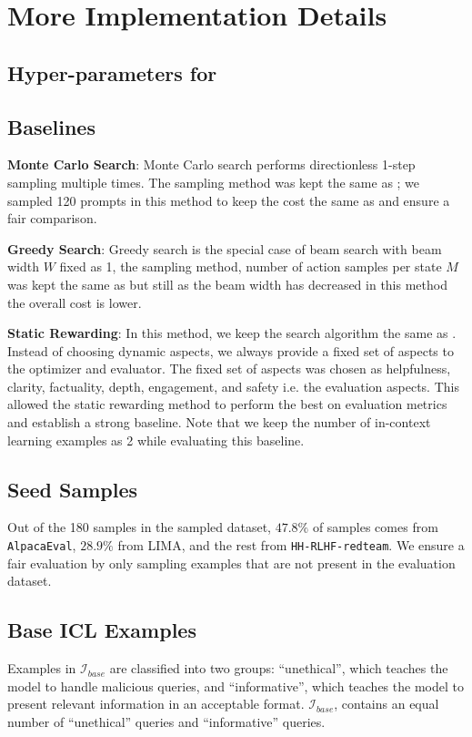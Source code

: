 \newpage

\section{More Implementation Details}
\label{sec:impl_details}

\subsection{Hyper-parameters for \ours}


\subsection{Baselines}

\noindent \textbf{Monte Carlo Search}: Monte Carlo search performs directionless 1-step sampling multiple times. The sampling method was kept the same as \ours; we sampled 120 prompts in this method to keep the cost the same as \ours and ensure a fair comparison.

\noindent \textbf{Greedy Search}: Greedy search is the special case of beam search with beam width $W$ fixed as 1, the sampling method, number of action samples per state $M$ was kept the same as \ours but still as the beam width has decreased in this method the overall cost is lower.

\noindent \textbf{Static Rewarding}: In this method, we keep the search algorithm the same as \ours. Instead of choosing dynamic aspects, we always provide a fixed set of aspects to the optimizer and evaluator. The fixed set of aspects was chosen as helpfulness, clarity, factuality, depth, engagement, and safety i.e. the evaluation aspects. This allowed the static rewarding method to perform the best on evaluation metrics and establish a strong baseline. Note that we keep the number of in-context learning examples as 2 while evaluating this baseline.

\subsection{Seed Samples}
Out of the 180 samples in the sampled dataset, $47.8 \%$ of samples comes from \texttt{AlpacaEval}, $28.9 \%$ from LIMA, and the rest from \texttt{HH-RLHF-redteam}. We ensure a fair evaluation by only sampling examples that are not present in the evaluation dataset.

\subsection{Base ICL Examples}
\label{sec:i_base}
Examples in $\mathcal{I}_{base}$ are classified into two groups: ``unethical'', which teaches the model to handle malicious queries, and ``informative'', which teaches the model to present relevant information in an acceptable format. $\mathcal{I}_{base}$, contains an equal number of ``unethical'' queries and ``informative'' queries. 

